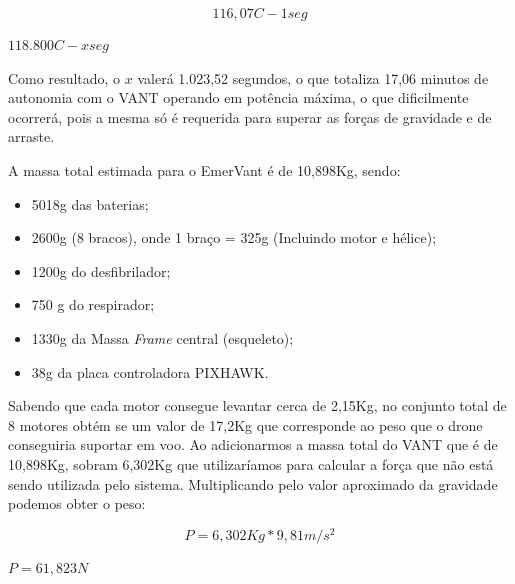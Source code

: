 \begin{equation}
  116,07 C  - 1 seg
\end{equation}

\begin{center}
  $118.800 C - x seg$
\end{center}

Como resultado, o $x$ valerá 1.023,52 segundos, o que totaliza 17,06 minutos de 
autonomia com o VANT operando em potência máxima, o que dificilmente ocorrerá, 
pois a mesma só é requerida para superar as forças de gravidade e de arraste.

A massa total estimada para o EmerVant é de 10,898Kg, sendo:
\begin{itemize}
\item 5018g das baterias;
\item 2600g (8 bracos), onde 1 braço = 325g (Incluindo motor e hélice);
\item 1200g do desfibrilador;
\item 750 g do respirador;
\item 1330g da Massa \textit{Frame} central (esqueleto);
\item 38g da placa controladora PIXHAWK.
\end{itemize}

Sabendo que cada motor consegue levantar cerca de 2,15Kg, 
no conjunto total de 8 motores obtém se um valor de 17,2Kg que 
corresponde ao peso que o  drone conseguiria suportar em voo.
Ao adicionarmos a massa total do VANT que é de 10,898Kg, sobram 6,302Kg que 
utilizaríamos para calcular a força que não está sendo utilizada pelo sistema. 
Multiplicando pelo valor aproximado da gravidade podemos obter o peso:

\begin{equation}
 P = 6,302 Kg * 9,81 {m} / {s}^2
\end{equation}

\begin{center}
   $P = 61,823 N$
\end{center}

